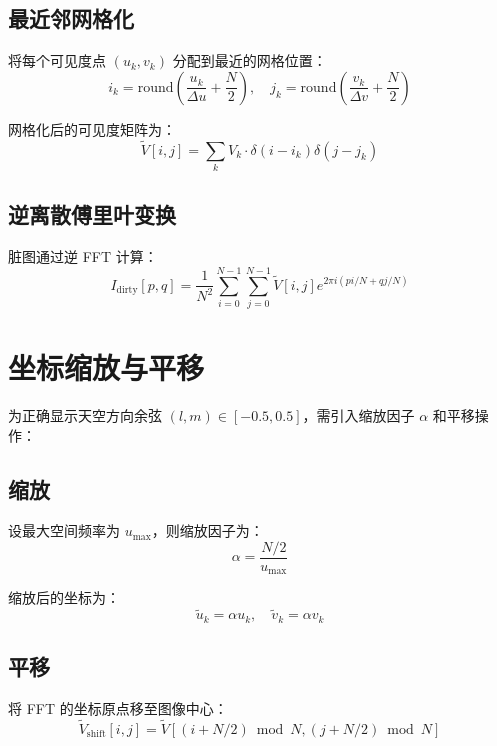 \documentclass{article}
\begin{document}
\subsection{最近邻网格化}
将每个可见度点 $ (u_k,v_k) $ 分配到最近的网格位置：
\begin{equation}
i_k = \text{round}\left( \frac{u_k}{\Delta u} + \frac{N}{2} \right), \quad j_k = \text{round}\left( \frac{v_k}{\Delta v} + \frac{N}{2} \right)
\end{equation}

网格化后的可见度矩阵为：
\begin{equation}
\widetilde{V}[i,j] = \sum_{k} V_k \cdot \delta(i - i_k) \delta(j - j_k)
\end{equation}

\subsection{逆离散傅里叶变换}
脏图通过逆 FFT 计算：
\begin{equation}
I_{\text{dirty}}[p,q] = \frac{1}{N^2} \sum_{i=0}^{N-1} \sum_{j=0}^{N-1} \widetilde{V}[i,j] e^{2\pi i (pi/N + qj/N)}
\end{equation}

\section{坐标缩放与平移}
为正确显示天空方向余弦 $ (l,m) \in [-0.5, 0.5] $，需引入缩放因子 $ \alpha $ 和平移操作：

\subsection{缩放}
设最大空间频率为 $ u_{\max} $，则缩放因子为：
\begin{equation}
\alpha = \frac{N/2}{u_{\max}}
\end{equation}

缩放后的坐标为：
\begin{equation}
\tilde{u}_k = \alpha u_k, \quad \tilde{v}_k = \alpha v_k
\end{equation}

\subsection{平移}
将 FFT 的坐标原点移至图像中心：
\begin{equation}
\widetilde{V}_{\text{shift}}[i,j] = \widetilde{V} \left[ (i + N/2) \bmod N, (j + N/2) \bmod N \right]
\end{equation}
\end{document}
